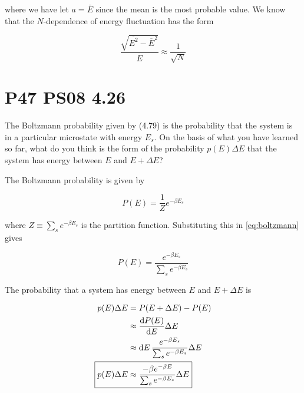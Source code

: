 \documentclass[9pt,a4paper,twocolumn]{article}
\begin{document}
where we have let $a = \bar{E}$ since the mean is the most probable value. We know that the $N$-dependence of energy fluctuation has the form

\begin{equation}
	\frac{\sqrt{\overline{E^2} - \overline{E}^2}}{\overline{E}} \approx \frac{1}{\sqrt{N}}
\end{equation}

\section{P47 PS08 4.26}
The Boltzmann probability given by (4.79) is the probability that the system is in a particular microstate with energy $E_s$. On the basis of what you have learned so far, what do you think is the form of the probability $p(E)\Delta E$ that the system has energy between $E$ and
$E + \Delta E$?

The Boltzmann probability is given by

\begin{equation}
	P(E) = \frac{1}{Z} e^{-\beta E_s} \label{eq:boltzmann}
\end{equation}

where $Z \equiv \sum_s e^{-\beta E_s}$ is the partition function. Substituting this in \eqref{eq:boltzmann} gives

\begin{equation}
	P(E) = \frac{e^{-\beta E_s}}{\sum_s e^{-\beta E_s}} \label{eq:boltzmann-partition}
\end{equation}

The probability that a system has energy between $E$ and $E + \Delta E$ is

\begin{align}
	p(E)\Delta E &= P(E + \Delta E) - P(E) \\
	&\approx \dv{P(E)}{E}\Delta E \label{eq:density-approx} \\
	&\approx \dd{E} \frac{e^{-\beta E_s}}{\sum_s e^{-\beta E_s}} \Delta E \nonumber \\
	\Aboxed{
		p(E)\Delta E &\approx \frac{-\beta e^{-\beta E}}{\sum_s e^{-\beta E_s}}\Delta E 
	} \label{eq:answer}
\end{align}
\end{document}
